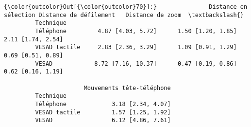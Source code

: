 \documentclass[letterpaper, 11pt]{article}
\begin{document}
\begin{Verbatim}[commandchars=\\\{\}]
{\color{outcolor}Out[{\color{outcolor}70}]:}               Distance en sélection Distance de défilement   Distance de zoom  \textbackslash{}
         Technique                                                                       
         Téléphone         4.87 [4.03, 5.72]      1.50 [1.20, 1.85]  2.11 [1.74, 2.54]   
         VESAD tactile     2.83 [2.36, 3.29]      1.09 [0.91, 1.29]  0.69 [0.51, 0.89]   
         VESAD            8.72 [7.16, 10.37]      0.47 [0.19, 0.86]  0.62 [0.16, 1.19]   
         
                       Mouvements tête-téléphone  
         Technique                                
         Téléphone             3.18 [2.34, 4.07]  
         VESAD tactile         1.57 [1.25, 1.92]  
         VESAD                 6.12 [4.86, 7.61]  
\end{Verbatim}
            
\end{document}
